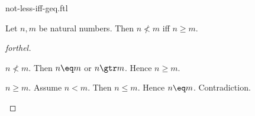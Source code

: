 \documentclass{stex}
\begin{document}
\begin{smodule}{not-less-iff-geq.ftl}


\begin{proposition}[forthel,id=NlessIffGeqProp]
  Let $n, m$ be natural numbers.
  Then $n \nless m$ iff $n \geq m$.
\end{proposition}
\begin{proof}[forthel]
  \begin{case}{$n \nless m$.}
    Then $n \eq m$ or $n \gtr m$.
    Hence $n \geq m$.
  \end{case}

  \begin{case}{$n \geq m$.}
    Assume $n \less m$.
    Then $n \leq m$.
    Hence $n \eq m$.
    Contradiction.
  \end{case}
\end{proof}

\end{smodule}
\end{document}
